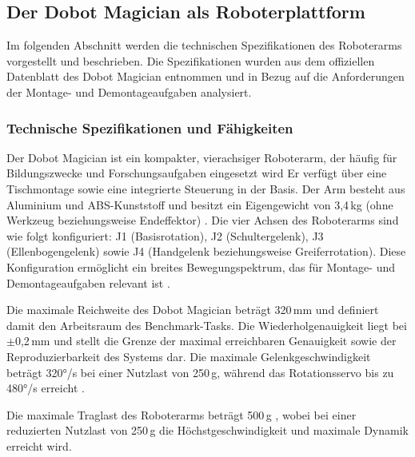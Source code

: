 \documentclass[12pt]{article}
\begin{document}
\subsection{Der Dobot Magician als Roboterplattform}
\label{sec:dobot_magician-chapter2}
Im folgenden Abschnitt werden die technischen Spezifikationen des Roboterarms vorgestellt und beschrieben. %
Die Spezifikationen wurden aus dem offiziellen Datenblatt des Dobot Magician entnommen und in Bezug auf die Anforderungen der Montage- und Demontageaufgaben analysiert.

\subsubsection{Technische Spezifikationen und Fähigkeiten}
Der Dobot Magician ist ein kompakter, vierachsiger Roboterarm, der häufig für Bildungszwecke und Forschungsaufgaben eingesetzt wird %
Er verfügt über eine Tischmontage sowie eine integrierte Steuerung in der Basis. Der Arm besteht aus Aluminium und ABS-Kunststoff und besitzt ein Eigengewicht von 3,4\,kg (ohne Werkzeug beziehungsweise Endeffektor) \cite{dobot_datasheet}. Die vier Achsen des Roboterarms sind wie folgt konfiguriert: J1 (Basisrotation), J2 (Schultergelenk), J3 (Ellenbogengelenk) sowie J4 (Handgelenk beziehungsweise Greiferrotation). Diese Konfiguration ermöglicht ein breites Bewegungspektrum, das für Montage- und Demontageaufgaben relevant ist \cite{dobot_datasheet}.

Die maximale Reichweite des Dobot Magician beträgt 320\,mm \cite{dobot_datasheet} und definiert damit den Arbeitsraum des Benchmark-Tasks. 
Die Wiederholgenauigkeit liegt bei $\pm$0,2\,mm \cite{dobot_datasheet} und stellt die Grenze der maximal erreichbaren Genauigkeit sowie der Reproduzierbarkeit des Systems dar. 
Die maximale Gelenkgeschwindigkeit beträgt 320°/s bei einer Nutzlast von 250\,g, während das Rotationsservo bis zu 480°/s erreicht \cite{dobot_datasheet}. 

Die maximale Traglast des Roboterarms beträgt 500\,g \cite{dobot_datasheet}, wobei bei einer reduzierten Nutzlast von 250\,g die Höchstgeschwindigkeit und maximale Dynamik erreicht wird. 
\end{document}
